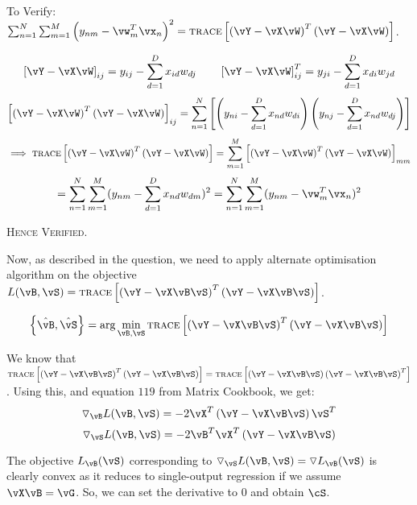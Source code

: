 \documentclass[a4paper,12pt]{article}
\begin{document}
\begin{mlsolution}

To Verify: $\sum_{n=1}^N\sum_{m=1}^M\br{y_{nm}-\vw_m^T\vx_n}^2 = \textsc{trace}\bs{\br{\vY-\vX\vW}^T\br{\vY-\vX\vW}}$.

\begin{equation*}
    \bs{\vY - \vX\vW}_{ij} = y_{ij} - \sum_{d=1}^Dx_{id}w_{dj} \qquad \bs{\vY - \vX\vW}_{ij}^T = y_{ji} - \sum_{d=1}^Dx_{di}w_{jd}
\end{equation*}
\begin{equation*}
    \bs{\br{\vY - \vX\vW}^T\br{\vY - \vX\vW}}_{ij} = \sum_{n=1}^N\bs{\br{y_{ni} - \sum_{d=1}^Dx_{nd}w_{di}}\br{y_{nj} - \sum_{d=1}^Dx_{nd}w_{dj}}}
\end{equation*}
\begin{equation*}
    \implies \textsc{trace}\bs{\br{\vY-\vX\vW}^T\br{\vY-\vX\vW}} = \sum_{m=1}^M\bs{\br{\vY-\vX\vW}^T\br{\vY-\vX\vW}}_{mm}
\end{equation*}
\begin{equation*}
    = \sum_{n=1}^N\sum_{m=1}^M (y_{nm} - \sum_{d=1}^Dx_{nd}w_{dm} )^2 = \sum_{n=1}^N\sum_{m=1}^M (y_{nm} - \vw_m^T\vx_n)^2
\end{equation*}
\begin{center}
    \textsc{Hence Verified}.
\end{center}

Now, as described in the question, we need to apply alternate optimisation algorithm on the objective $L(\vB, \vS) = \textsc{trace}\bs{\br{\vY-\vX\vB\vS}^T\br{\vY-\vX\vB\vS}}$.

\begin{equation*}
    \bc{\hat{\vB}, \hat{\vS}} = \text{arg} \min\limits_{\vB, \vS} \textsc{trace}\bs{\br{\vY-\vX\vB\vS}^T\br{\vY-\vX\vB\vS}}
\end{equation*}

We know that $\textsc{trace}\bs{\br{\vY-\vX\vB\vS}^T\br{\vY-\vX\vB\vS}} = \textsc{trace}\bs{\br{\vY-\vX\vB\vS}\br{\vY-\vX\vB\vS}^T}$. Using this, and equation $119$ from Matrix Cookbook, we get:
\begin{equation*}
    \triangledown_{\vB}L(\vB, \vS) = -2\vX^T\br{\vY - \vX\vB\vS}\vS^T
\end{equation*}
\begin{equation*}
    \triangledown_{\vS}L(\vB, \vS) = -2\vB^T\vX^T\br{\vY - \vX\vB\vS}
\end{equation*}

The objective $L_{\vB}(\vS)$ corresponding to $\triangledown_{\vS}L(\vB, \vS) = \triangledown L_{\vB}(\vS)$ is clearly convex as it reduces to single-output regression if we assume $\vX\vB = \vG$. So, we can set the derivative to $0$ and obtain $\cS$.


\end{mlsolution}
\end{document}

